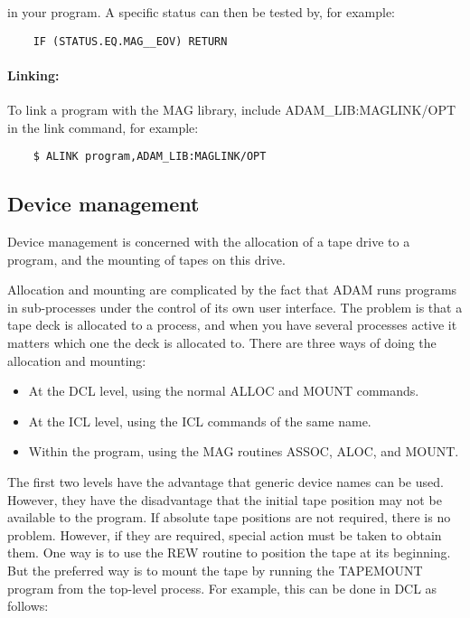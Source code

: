 in your program.
A specific status can then be tested by, for example:

\begin{small}
\begin{verbatim}
    IF (STATUS.EQ.MAG__EOV) RETURN
\end{verbatim}
\end{small}

\paragraph{Linking:}\hfill
{}

To link a program with the MAG library, include ADAM\_LIB:MAGLINK/OPT in the
link command, for example:

\begin{small}
\begin{verbatim}
    $ ALINK program,ADAM_LIB:MAGLINK/OPT
\end{verbatim}
\end{small}

\subsection{Device management}

Device management is concerned with the allocation of a tape drive to a program,
and the mounting of tapes on this drive.

Allocation and mounting are complicated by the fact that ADAM runs programs in
sub-processes under the control of its own user interface.
The problem is that a tape deck is allocated to a process, and when you have
several processes active it matters which one the deck is allocated to.
There are three ways of doing the allocation and mounting:
\begin{itemize}
\item At the DCL level, using the normal ALLOC and MOUNT commands.
\item At the ICL level, using the ICL commands of the same name.
\item Within the program, using the MAG routines ASSOC, ALOC, and MOUNT.
\end{itemize}
The first two levels have the advantage that generic device names can be used.
However, they have the disadvantage that the initial tape position may not
be available to the program.
If absolute tape positions are not required, there is no problem.
However, if they are required, special action must be taken to obtain them.
One way is to use the REW routine to position the tape at its beginning.
But the preferred way is to mount the tape by running the TAPEMOUNT program
from the top-level process.
For example, this can be done in DCL as follows:

